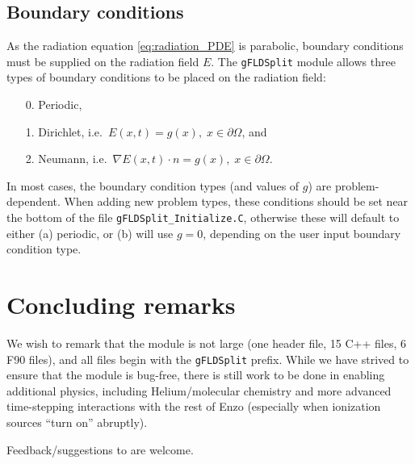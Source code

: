 \documentclass[letterpaper,10pt]{article}
\renewcommand{\(}{\left(}
\renewcommand{\)}{\right)}
\begin{document}
\subsection{Boundary conditions}
\label{sec:boundary_conditions}

As the radiation equation \eqref{eq:radiation_PDE} is parabolic,
boundary conditions must be supplied on the radiation field $E$.  The
{\tt gFLDSplit} module allows three types of boundary conditions to
be placed on the radiation field:
\begin{itemize}
\item[0.] Periodic,
\item[1.] Dirichlet, i.e.~$E(x,t) = g(x), \; x\in\partial\Omega$, and
\item[2.] Neumann, i.e.~$\nabla E(x,t)\cdot n = g(x), \; x\in\partial\Omega$.
\end{itemize}
In most cases, the boundary condition types (and values of $g$) are
problem-dependent.  When adding new problem types, these conditions
should be set near the bottom of the file {\tt gFLDSplit\_Initialize.C}, 
otherwise these will default to either (a) periodic, or (b) will use
$g=0$, depending on the user input boundary condition type.



\section{Concluding remarks}
\label{sec:conclusions}

We wish to remark that the module is not large (one header
file, 15 C++ files, 6 F90 files), and all files begin with the 
{\tt gFLDSplit} prefix.  While we have strived to ensure that the
module is bug-free, there is still work to be done in enabling
additional physics, including Helium/molecular chemistry and more
advanced time-stepping interactions with the rest of Enzo (especially
when ionization sources ``turn on'' abruptly).  

Feedback/suggestions to are welcome.




\end{document}

